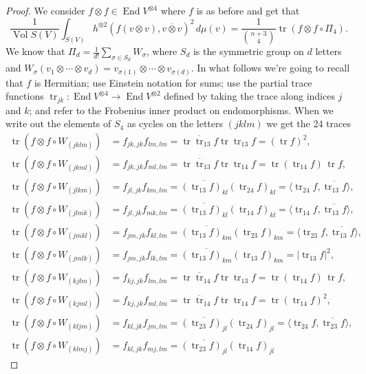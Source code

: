 \documentclass[10pt,a4paper]{amsart}
\theoremstyle{definition}
\def\ov#1{\overline{#1}}
\def\d{\,d}
\DeclareMathOperator{\tr}{tr}
\DeclareMathOperator{\Vol}{Vol}
\DeclareMathOperator{\End}{End}
\begin{document}
\begin{proof}
We consider $f \otimes f \in \End V^{\otimes 4}$ where
$f$ is as before and get that
$$
\frac{1}{\Vol S(V)}
\int_{S(V)}
\!\!\!
h^{\otimes 2}(f(v \otimes v), \ov{v \otimes v})^2 \d\mu(v)
= \frac{1}{\binom{n+3}{4}}
\tr (f \otimes f \circ \Pi_4).
$$
We know that $\Pi_d = \frac{1}{d!}\sum_{\sigma \in S_d} W_\sigma$, where $S_d$ is the
symmetric group on $d$ letters and $W_\sigma(v_1 \otimes \cdots \otimes v_d) =
v_{\sigma(1)} \otimes \cdots \otimes v_{\sigma(d)}$.
In what follows we're going to recall that $f$ is Hermitian;
use Einstein notation for sums;
use the partial trace
functions $\tr_{jk} : \End V^{\otimes 4} \to \End V^{\otimes 2}$ defined by
taking the trace along indices $j$ and $k$;
and refer to the Frobenius inner product on endomorphisms.
When we write out the elements of $S_4$ as cycles on the letters $(jklm)$
we get the 24 traces
\begin{align*}
\tr(f \otimes f \circ W_{(jklm)})
&= f_{jk,jk} f_{lm,lm}
= \ov{\tr \tr_{13} f} \tr \tr_{13} f
= (\tr f)^2,
\\
\tr(f \otimes f \circ W_{(jkml)})
&= f_{jk,jk} f_{ml,lm}
= \ov{\tr \tr_{13} f} \tr \tr_{14} f
= \tr(\tr_{14} f) \, \tr f,
\\
\tr(f \otimes f \circ W_{(jlkm)})
&= f_{jl,jk} f_{km,lm}
= \ov{(\tr_{13} f)_{kl}} (\tr_{24} f)_{kl}
= \langle \tr_{24} f, \ov{\tr_{13} f} \rangle,
\\
\tr(f \otimes f \circ W_{(jlmk)})
&= f_{jl,jk} f_{mk,lm}
= \ov{(\tr_{13} f)_{kl}} (\tr_{14} f)_{kl}
= \langle \tr_{14} f, \ov{\tr_{13} f} \rangle,
\\
\tr(f \otimes f \circ W_{(jmkl)})
&= f_{jm,jk} f_{kl,lm}
= \ov{(\tr_{13} f)_{km}} (\tr_{23} f)_{km}
= \langle \tr_{23} f, \ov{\tr_{13} f} \rangle,
\\
\tr(f \otimes f \circ W_{(jmlk)})
&= f_{jm,jk} f_{lk,lm}
= \ov{(\tr_{13} f)_{km}} (\tr_{13} f)_{km}
= |\!\tr_{13} f|^2,
\\
\tr(f \otimes f \circ W_{(kjlm)})
&= f_{kj,jk} f_{lm,lm}
= \ov{\tr \tr_{14} f} \tr \tr_{13} f
= \tr(\tr_{14}f) \, \tr f,
\\
\tr(f \otimes f \circ W_{(kjml)})
&= f_{kj,jk} f_{ml,lm}
= \ov{\tr \tr_{14} f} \tr \tr_{14} f
= \tr(\tr_{14} f)^2,
\\
\tr(f \otimes f \circ W_{(kljm)})
&= f_{kl,jk} f_{jm,lm}
= \ov{(\tr_{23} f)_{jl}} (\tr_{24} f)_{jl}
= \langle \tr_{24} f, \ov{\tr_{23} f} \rangle,
\\
\tr(f \otimes f \circ W_{(klmj)})
&= f_{kl,jk} f_{mj,lm}
= \ov{(\tr_{23} f)_{jl}} (\tr_{14} f)_{jl}

\end{align*}
\end{proof}
\end{document}
